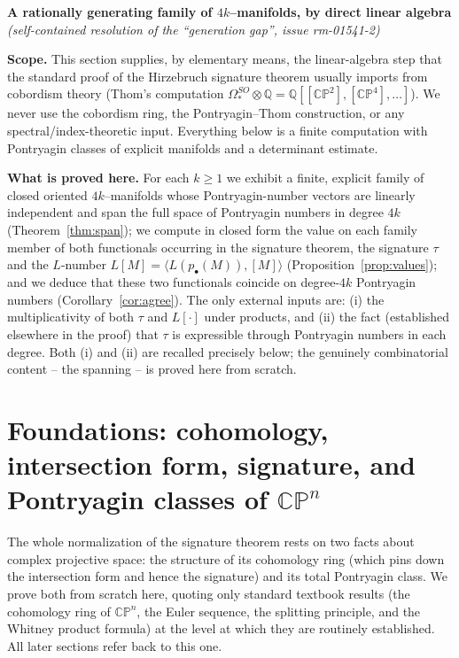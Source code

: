 \documentclass[12pt]{article}
\theoremstyle{definition}
\begin{document}
\begin{center}
\textbf{\large A rationally generating family of $4k$--manifolds, by direct linear
algebra}\\[2pt]
\textit{(self-contained resolution of the ``generation gap'', issue rm-01541-2)}
\end{center}

\bigskip

\noindent
\textbf{Scope.}
This section supplies, by elementary means, the linear-algebra step that the standard
proof of the Hirzebruch signature theorem usually imports from cobordism theory
(Thom's computation $\Omega^{SO}_\ast\otimes\mathbb{Q}=
\mathbb{Q}[[\mathbb{CP}^2],[\mathbb{CP}^4],\dots]$).  We never use the cobordism ring,
the Pontryagin--Thom construction, or any spectral/index-theoretic input.  Everything
below is a finite computation with Pontryagin classes of explicit manifolds and a
determinant estimate.

\medskip

\noindent
\textbf{What is proved here.}
For each $k\ge 1$ we exhibit a finite, explicit family of closed oriented
$4k$--manifolds whose Pontryagin-number vectors are linearly independent and span the
full space of Pontryagin numbers in degree $4k$ (Theorem~\ref{thm:span}); we compute in
closed form the value on each family member of both functionals occurring in the
signature theorem, the signature $\tau$ and the $L$-number
$L[M]=\langle L(p_\bullet(M)),[M]\rangle$ (Proposition~\ref{prop:values}); and we deduce
that these two functionals coincide on degree-$4k$ Pontryagin numbers
(Corollary~\ref{cor:agree}).  The only external inputs are: (i) the multiplicativity of
both $\tau$ and $L[\cdot]$ under products, and (ii) the fact (established elsewhere in
the proof) that $\tau$ is expressible through Pontryagin numbers in each degree.  Both
(i) and (ii) are recalled precisely below; the genuinely combinatorial content -- the
spanning -- is proved here from scratch.

\bigskip


\section{Foundations: cohomology, intersection form, signature, and Pontryagin
classes of $\mathbb{CP}^{n}$}\label{sec:found}

The whole normalization of the signature theorem rests on two facts about complex
projective space: the structure of its cohomology ring (which pins down the intersection
form and hence the signature) and its total Pontryagin class.  We prove both from
scratch here, quoting only standard textbook results (the cohomology ring of
$\mathbb{CP}^n$, the Euler sequence, the splitting principle, and the Whitney product
formula) at the level at which they are routinely established.  All later sections refer
back to this one.
\end{document}
